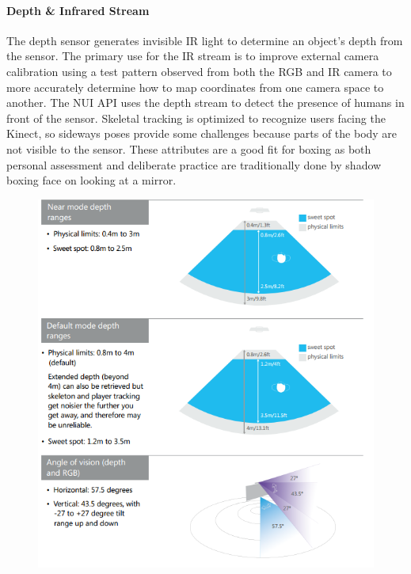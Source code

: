 \paragraph{Depth \& Infrared Stream}
The depth sensor generates invisible IR light to determine an object's depth from the sensor. The primary use for the IR stream is to improve external camera calibration using a test pattern observed from both the RGB and IR camera to more accurately determine how to map coordinates from one camera space to another. \cite{irstream} The NUI API uses the depth stream to detect the presence of humans in front of the sensor.\cite{winSDK} Skeletal tracking is optimized to recognize users facing the Kinect, so sideways poses provide some challenges because parts of the body are not visible to the sensor.
These attributes are a good fit for boxing as both personal assessment and deliberate practice are traditionally done by shadow boxing face on looking at a mirror.

\begin{figure}[h]
    \centering
    \includegraphics[height=0.45\textheight]{fig02/kinDepth}
    \label{fig:kinsdepth}
\end{figure}


